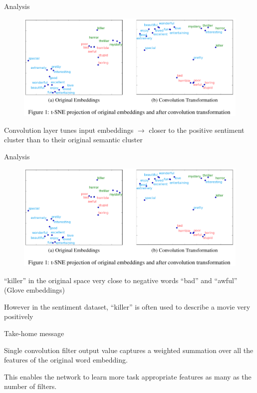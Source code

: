 \documentclass[12pt]{beamer}
\begin{document}
\begin{frame}{Analysis}
	
	\begin{figure}
		\includegraphics[width=1\linewidth]{img/cnnanalysis2.png}
	\end{figure}
	
	
Convolution layer tunes input embeddings $\to$ closer to the positive sentiment cluster than to their original semantic cluster


\end{frame}


\begin{frame}{Analysis}
	
	\begin{figure}
		\includegraphics[width=1\linewidth]{img/cnnanalysis2.png}
	\end{figure}
	
	
\begin{small}
	
	“killer” in the original space very close to negative words “bad” and “awful” (Glove embeddings)
	
	However in the sentiment dataset, “killer” is often used to describe a movie very positively
\end{small}	
\end{frame}


\begin{frame}{Take-home message}
	
	
Single convolution filter output value captures a weighted summation over all the features of the original word embedding.

This enables the network to learn more task appropriate features as	many as the number of filters.

\bigskip

	
\end{frame}
\end{document}
